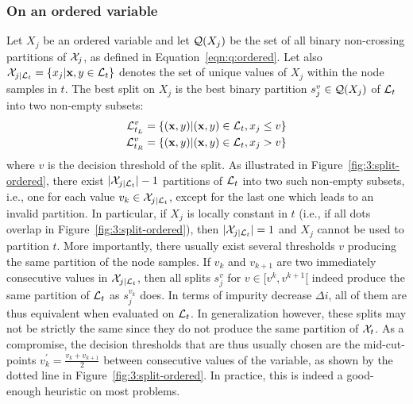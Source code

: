 \subsubsection{On an ordered variable}
\label{sec:best-split-ordered}

Let $X_j$ be an ordered variable and let ${\cal Q}(X_j)$ be the set of all
binary non-crossing partitions of ${\cal X}_j$, as defined in
Equation~\ref{eqn:q:ordered}. Let also ${\cal X}_{j|{\cal L}_t} = \{ x_j | \mathbf{x},y
\in {\cal L}_t \}$ denotes the set of unique values of $X_j$ within the node
samples in $t$.  The best split on $X_j$ is the best binary partition
$s^v_j \in {\cal Q}(X_j)$ of ${\cal L}_t$ into two non-empty subsets:
\begin{align*}
{\cal L}^v_{t_L} &= \{(\mathbf{x}, y)|(\mathbf{x}, y)\in {\cal L}_t, x_j \leq v\}\\
{\cal L}^v_{t_R} &= \{(\mathbf{x}, y)|(\mathbf{x}, y)\in {\cal L}_t, x_j > v\}
\end{align*}
where $v$ is the decision threshold of the split. As illustrated in
Figure~\ref{fig:3:split-ordered}, there exist $|{\cal X}_{j|{\cal
L}_t}|-1$ partitions of ${\cal L}_t$ into two such non-empty subsets, i.e., one
for each value $v_k \in {\cal X}_{j|{\cal L}_t}$, except for the last one which
leads to an invalid partition. In particular, if $X_j$ is locally constant in
$t$ (i.e., if all dots overlap in Figure~\ref{fig:3:split-ordered}), then
$|{\cal X}_{j|{\cal L}_t}|=1$ and $X_j$ cannot be used to partition $t$. More
importantly, there usually exist several thresholds $v$ producing the same
partition of the node samples. If $v_k$ and $v_{k+1}$ are two immediately
consecutive values in  ${\cal X}_{j|{\cal L}_t}$, then all splits $s^{v}_j$ for
$v \in [v^k, v^{k+1}[$ indeed produce the same partition of ${\cal L}_t$ as
$s^{v_k}_j$ does. In terms of impurity decrease $\Delta i$, all of them are
thus equivalent when evaluated on ${\cal L}_t$. In generalization however,
these splits may not be strictly the same since they do not produce the same
partition of ${\cal X}_t$. As a compromise, the decision thresholds that are
thus usually chosen are the mid-cut-points $v^\prime_k=\tfrac{v_k+v_{k+1}}{2}$
between consecutive values of the variable, as shown by the dotted line in
Figure~\ref{fig:3:split-ordered}. In practice, this is indeed a good-enough
heuristic on most problems.


